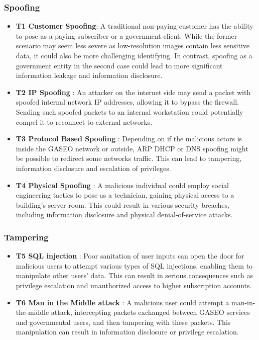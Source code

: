 \documentclass[12pt]{article}
\begin{document}
\subsubsection*{Spoofing}
\begin{itemize}
    \item \textbf{ T1 Customer Spoofing}: A traditional non-paying customer has the ability to pose as a paying subscriber or a government client. While the former scenario may seem less severe as low-resolution images contain less sensitive data, it could also be more challenging identifying. In contrast, spoofing as a government entity in the second case could lead to more significant information leakage and information disclosure.
    
    \item \textbf{ T2 IP Spoofing }: An attacker on the internet side may send a packet with spoofed internal network IP addresses, allowing it to bypass the firewall. Sending such spoofed packets to an internal workstation could potentially compel it to reconnect to external networks.

    \item \textbf{ T3 Protocol Based Spoofing }: Depending on if the malicious actors is inside the GASEO network or outside, ARP DHCP or DNS spoofing might be possible to redirect some networks traffic. This can lead to tampering, information disclosure and escalation of privileges.
    
    \item \textbf{ T4 Physical Spoofing }: A malicious individual could employ social engineering tactics to pose as a technician, gaining physical access to a building's server room. This could result in various security breaches, including information disclosure and physical denial-of-service attacks.
\end{itemize}

\subsubsection*{Tampering}
\begin{itemize}
    \item \textbf{ T5 SQL injection }: Poor sanitation of user inputs can open the door for malicious users to attempt various types of SQL injections, enabling them to manipulate other users' data. This can result in serious consequences such as privilege escalation and unauthorized access to higher subscription accounts.
    
    \item \textbf{ T6 Man in the Middle attack }: A malicious user could attempt a man-in-the-middle attack, intercepting packets exchanged between GASEO services and governmental users, and then tampering with these packets. This manipulation can result in information disclosure or privilege escalation.
\end{itemize}
\end{document}
